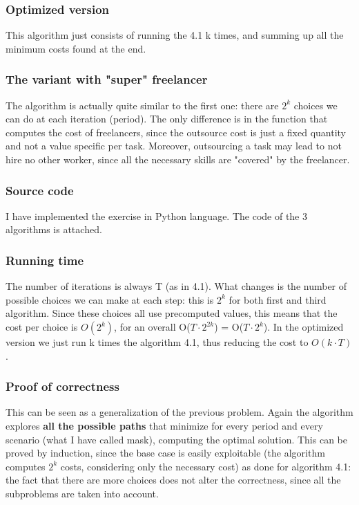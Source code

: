 \subsubsection{Optimized version}
This algorithm just consists of running the 4.1 k times, and summing up all the minimum costs found at the end.

\subsubsection{The variant with "super" freelancer}
The algorithm is actually quite similar to the first one: there are $2^k$ choices we can do at each iteration (period). The only difference is in the function that computes the cost of freelancers, since the outsource cost is just a fixed quantity and not a value specific per task. Moreover, outsourcing a task may lead to not hire no other worker, since all the necessary skills are "covered" by the freelancer.

\subsubsection{Source code}
I have implemented the exercise in Python language. The code of the 3 algorithms is attached.

\subsubsection{Running time}
The number of iterations is always T (as in 4.1). What changes is the number of possible choices we can make at each step: this is $2^k$ for both first and third algorithm. Since these choices all use precomputed values, this means that the cost per choice is $O(2^k)$, for an overall O($T \cdot 2^{2k}$) = O($T \cdot 2^k$). In the optimized version we just run k times the algorithm 4.1, thus reducing the cost to $O(k \cdot T)$.

\subsubsection{Proof of correctness}
This can be seen as a generalization of the previous problem. Again the algorithm explores \textbf{all the possible paths} that minimize for every period and every scenario (what I have called mask), computing the optimal solution. This can be proved by induction, since the base case is easily exploitable (the algorithm computes $2^k$ costs, considering only the necessary cost) as done for algorithm 4.1: the fact that there are more choices does not alter the correctness, since all the subproblems are taken into account. 

